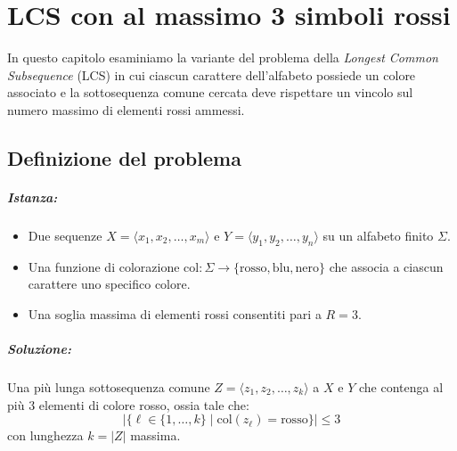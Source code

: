 %

\chapter{LCS con al massimo 3 simboli rossi}

In questo capitolo esaminiamo la variante del problema della \emph{Longest Common Subsequence} (LCS) in cui ciascun carattere dell'alfabeto possiede un colore associato e la sottosequenza comune cercata deve rispettare un vincolo sul numero massimo di elementi rossi ammessi.

\section{Definizione del problema}

\paragraph{Istanza:}
\begin{itemize}
    \item Due sequenze $X = \langle x_1, x_2, \dots, x_m \rangle$ e $Y = \langle y_1, y_2, \dots, y_n \rangle$ su un alfabeto finito $\Sigma$.
    \item Una funzione di colorazione $\text{col}: \Sigma \to \{\text{rosso}, \text{blu}, \text{nero}\}$ che associa a ciascun carattere uno specifico colore.
    \item Una soglia massima di elementi rossi consentiti pari a $R = 3$.
\end{itemize}

\paragraph{Soluzione:}
Una più lunga sottosequenza comune $Z = \langle z_1, z_2, \dots, z_k \rangle$ a $X$ e $Y$ che contenga al più $3$ elementi di colore rosso, ossia tale che:
\[
|\{ \ell \in \{1, \dots, k\} \mid \text{col}(z_\ell) = \text{rosso} \}| \le 3
\]
con lunghezza $k = |Z|$ massima.

